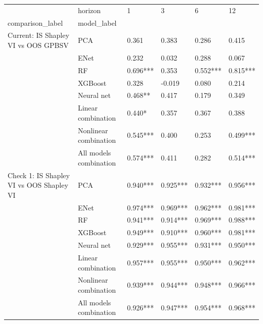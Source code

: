 \begin{tabular}{llllll}
\toprule
                                     & horizon &        1  &        3  &        6  &        12 \\
comparison\_label & model\_label &           &           &           &           \\
\midrule
Current: IS Shapley VI vs OOS GPBSV & PCA &     0.361 &     0.383 &     0.286 &     0.415 \\
                                     & ENet &     0.232 &     0.032 &     0.288 &     0.067 \\
                                     & RF &  0.696*** &     0.353 &  0.552*** &  0.815*** \\
                                     & XGBoost &     0.328 &    -0.019 &     0.080 &     0.214 \\
                                     & Neural net &   0.468** &     0.417 &     0.179 &     0.349 \\
                                     & Linear combination &    0.440* &     0.357 &     0.367 &     0.388 \\
                                     & Nonlinear combination &  0.545*** &     0.400 &     0.253 &  0.499*** \\
                                     & All models combination &  0.574*** &     0.411 &     0.282 &  0.514*** \\
Check 1: IS Shapley VI vs OOS Shapley VI & PCA &  0.940*** &  0.925*** &  0.932*** &  0.956*** \\
                                     & ENet &  0.974*** &  0.969*** &  0.962*** &  0.981*** \\
                                     & RF &  0.941*** &  0.914*** &  0.969*** &  0.988*** \\
                                     & XGBoost &  0.949*** &  0.910*** &  0.960*** &  0.981*** \\
                                     & Neural net &  0.929*** &  0.955*** &  0.931*** &  0.950*** \\
                                     & Linear combination &  0.957*** &  0.955*** &  0.950*** &  0.962*** \\
                                     & Nonlinear combination &  0.939*** &  0.944*** &  0.948*** &  0.966*** \\
                                     & All models combination &  0.926*** &  0.947*** &  0.954*** &  0.968*** \\

\end{tabular}
